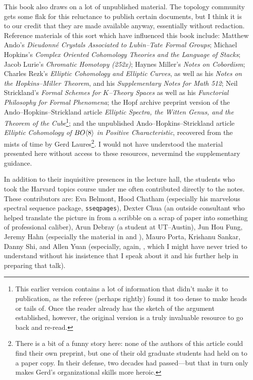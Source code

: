This book also draws on a lot of unpublished material.  The topology community gets some flak for this reluctance to publish certain documents, but I think it is to our credit that they are made available anyway, essentially without redaction.  Reference materials of this sort which have influenced this book include: Matthew Ando's \textit{Dieudonn\'e Crystals Associated to Lubin--Tate Formal Groups}; Michael Hopkins's \textit{Complex Oriented Cohomology Theories and the Language of Stacks}; Jacob Lurie's \textit{Chromatic Homotopy (252x)}; Haynes Miller's \textit{Notes on Cobordism}; Charles Rezk's \textit{Elliptic Cohomology and Elliptic Curves}, as well as his \textit{Notes on the Hopkins--Miller Theorem}, and his \textit{Supplementary Notes for Math 512}; Neil Strickland's \textit{Formal Schemes for $K$--Theory Spaces} as well as his \textit{Functorial Philosophy for Formal Phenomena}; the Hopf archive preprint version of the Ando--Hopkins--Strickland article \textit{Elliptic Spectra, the Witten Genus, and the Theorem of the Cube}\footnote{This earlier version contains a lot of information that didn't make it to publication, as the referee (perhaps rightly) found it too dense to make heads or tails of.  Once the reader already has the sketch of the argument established, however, the original version is a truly invaluable resource to go back and re-read.}; and the unpublished Ando--Hopkins--Strickland article \textit{Elliptic Cohomology of $BO\langle8\rangle$ in Positive Characteristic}, recovered from the mists of time by Gerd Laures\footnote{There is a bit of a funny story here: none of the authors of this article could find their own preprint, but one of their old graduate students had held on to a paper copy.  In their defense, two decades had passed---but that in turn only makes Gerd's organizational skills more heroic.}.  I would not have understood the material presented here without access to these resources, nevermind the supplementary guidance.

In addition to their inquisitive presences in the lecture hall, the students who took the Harvard topics course under me often contributed directly to the notes.  These contributors are: Eva Belmont, Hood Chatham (especially his marvelous spectral sequence package, \texttt{sseqpages}), Dexter Chua (an outside consultant who helped translate the picture in  from a scribble on a scrap of paper into something of professional caliber), Arun Debray (a student at UT--Austin), Jun Hou Fung, Jeremy Hahn (especially the material in  and ), Mauro Porta, Krishanu Sankar, Danny Shi, and Allen Yuan (especially, again, , which I might have never tried to understand without his insistence that I speak about it and his further help in preparing that talk).

